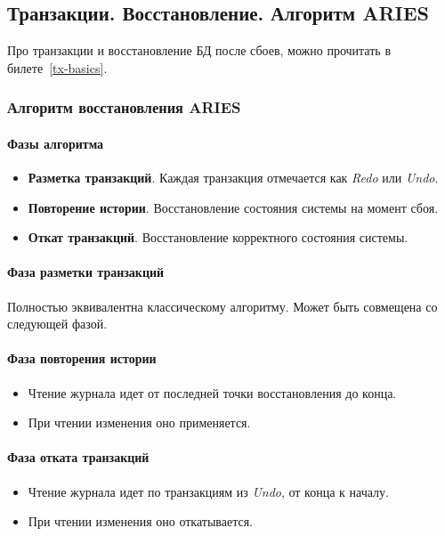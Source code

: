 \subsection{Транзакции. Восстановление. Алгоритм ARIES}

Про транзакции и восстановление БД после сбоев, можно прочитать в билете~\ref{tx-basics}.

\subsubsection{Алгоритм восстановления ARIES}

\paragraph{Фазы алгоритма}

\begin{itemize}
	\item \textbf{Разметка транзакций}. Каждая транзакция отмечается как
	      \textit{Redo} или \textit{Undo}.
	\item \textbf{Повторение истории}. Восстановление состояния системы на момент сбоя.
	\item \textbf{Откат транзакций}. Восстановление корректного состояния системы.
\end{itemize}

\paragraph{Фаза разметки транзакций}

Полностью эквивалентна классическому алгоритму. Может быть совмещена со следующей фазой.

\paragraph{Фаза повторения истории}

\begin{itemize}
	\item Чтение журнала идет от последней точки восстановления до конца.
	\item При чтении изменения оно применяется.
\end{itemize}

\paragraph{Фаза отката транзакций}

\begin{itemize}
	\item Чтение журнала идет по транзакциям из \textit{Undo}, от конца к началу.
	\item При чтении изменения оно откатывается.
\end{itemize}

